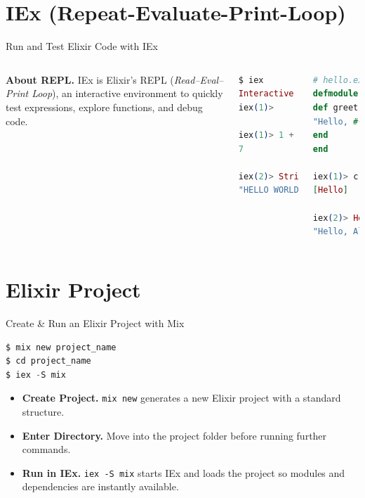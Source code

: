 \documentclass[aspectratio=169, table]{beamer}
\begin{document}
\section{IEx (Repeat-Evaluate-Print-Loop)}
\begin{frame}[fragile]{Run and Test Elixir Code with IEx}
	\vspace{20pt}
\begin{columns}[t]
\textbf{About REPL.}  
IEx is Elixir’s REPL (\textit{Read–Eval–Print Loop}),  
an interactive environment to quickly test expressions,  
explore functions, and debug code.  

\begin{lstlisting}[language=Elixir]
$ iex
Interactive Elixir (1.16.0)
iex(1)>

iex(1)> 1 + 2 * 3
7

iex(2)> String.upcase("hello world")
"HELLO WORLD"
\end{lstlisting}

\begin{lstlisting}[language=Elixir]
# hello.exs
defmodule Hello do
def greet(name) do
"Hello, #{name}!"
end
end

iex(1)> c("hello.exs")
[Hello]

iex(2)> Hello.greet("Alice")
"Hello, Alice!"
\end{lstlisting}
\end{columns}
\end{frame}

\section{Elixir Project}

\begin{frame}[fragile]{Create \& Run an Elixir Project with Mix}
\vspace{20pt}
\begin{lstlisting}[language=Elixir]
$ mix new project_name
$ cd project_name
$ iex -S mix
\end{lstlisting}

\begin{itemize}
\item \textbf{Create Project.} \texttt{mix new} generates a new Elixir project with a standard structure.  
\item \textbf{Enter Directory.} Move into the project folder before running further commands.  
\item \textbf{Run in IEx.} \texttt{iex -S mix} starts IEx and loads the project so modules and dependencies are instantly available.  
\end{itemize}
\end{frame}
\end{document}
